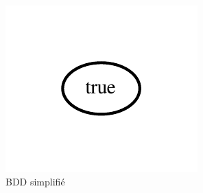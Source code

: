\documentclass[a4paper,11pt]{article}
\begin{document}
\begin{figure}[!htb]
\begin{minipage}{0.24\textwidth}
    \includegraphics[width=1\linewidth]{tests_rapport/test2_simplified_bdd.pdf}
    \caption*{BDD simplifié}
  \end{minipage}
\end{figure}
\end{document}
